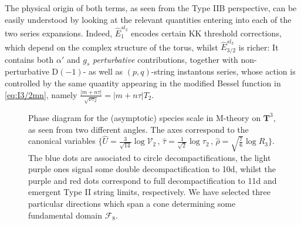 \eeq
%
The physical origin of both terms, as seen from the Type IIB perspective, can be easily understood by looking at the relevant quantities entering into each of the two series expansions. Indeed, $\hat{E}_{1}^{sl_2}$ encodes certain KK threshold corrections, which depend on the complex structure of the torus, whilst $\hat{E}_{3/2}^{sl_3}$ is richer: It contains both $\alpha'$ and $g_s$ \emph{perturbative} contributions, together with non-perturbative D$(-1)$- as well as $(p,q)$-string instantons series, whose action is controlled by the same quantity appearing in the modified Bessel function in \eqref{eq:I3/2mn}, namely $\frac{\left| m+n\tau \right|}{\sqrt{\nu \tau_2}}=\left| m+n\tau \right|T_2$.

\begin{figure}[htb]
		\begin{center}
			\caption{\small Phase diagram for the (asymptotic) species scale in M-theory on $\mathbf{T}^3$, as seen from two different angles. The axes correspond to the canonical variables $\lbrace \hat U = \frac{3}{\sqrt{14}} \log \mathcal{V}_2\, ,\, \hat \tau= \frac{1}{\sqrt{2}}\log \tau_2\, ,\, \hat \rho = \sqrt{\frac76} \log R_3\rbrace$. The blue dots are associated to circle decompactifications, the light purple ones signal some double decompactification to 10d, whilst the purple and red dots correspond to full decompactification to 11d and emergent Type II string limits, respectively. We have selected three particular directions which span a cone determining some fundamental domain $\mathscr{F}_8$.}
			\label{fig:MthyT3}
		\end{center}
\end{figure} 

